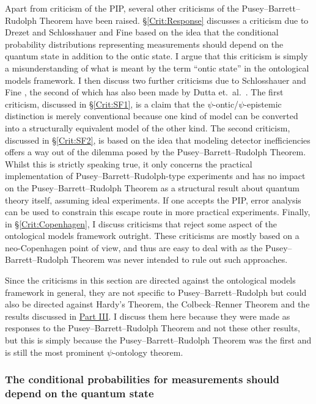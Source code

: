 \documentclass[DIV=calc,fontsize=12pt]{scrartcl} %
\theoremstyle{definition}
\theoremstyle{plain}
\begin{document}
Apart from criticism of the PIP, several other criticisms of the
Pusey--Barrett--Rudolph Theorem have been raised.
\S\ref{Crit:Response} discusses a criticism due to Drezet
\cite{Drezet2012, Drezet2012a} and Schlosshauer and Fine
\cite{Schlosshauer2012} based on the idea that the conditional
probability distributions representing measurements should depend on
the quantum state in addition to the ontic state.  I argue that this
criticism is simply a misunderstanding of what is meant by the term
``ontic state'' in the ontological models framework.  I then discuss
two further criticisms due to Schlosshauer and Fine
\cite{Schlosshauer2012}, the second of which has also been made by
Dutta et.\ al.\ \cite{Dutta2014}.  The first criticism, discussed in
\S\ref{Crit:SF1}, is a claim that the $\psi$-ontic/$\psi$-epistemic
distinction is merely conventional because one kind of model can be
converted into a structurally equivalent model of the other kind.  The
second criticism, discussed in \S\ref{Crit:SF2}, is based on the idea
that modeling detector inefficiencies offers a way out of the dilemma
posed by the Pusey--Barrett--Rudolph Theorem.  Whilst this is strictly
speaking true, it only concerns the practical implementation of
Pusey--Barrett--Rudolph-type experiments and has no impact on the
Pusey--Barrett--Rudolph Theorem as a structural result about quantum
theory itself, assuming ideal experiments.  If one accepts the PIP,
error analysis can be used to constrain this escape route in more
practical experiments.  Finally, in \S\ref{Crit:Copenhagen}, I discuss
criticisms that reject some aspect of the ontological models framework
outright.  These criticisms are mostly based on a neo-Copenhagen point
of view, and thus are easy to deal with as the Pusey--Barrett--Rudolph
Theorem was never intended to rule out such approaches.

Since the criticisms in this section are directed against the
ontological models framework in general, they are not specific to Pusey--Barrett--Rudolph
but could also be directed against Hardy's Theorem, the Colbeck--Renner
Theorem and the results discussed in \hyperref[Beyond]{Part III}.  I discuss
them here because they were made as responses to the Pusey--Barrett--Rudolph Theorem and
not these other results, but this is simply because the Pusey--Barrett--Rudolph Theorem
was the first and is still the most prominent $\psi$-ontology theorem.

\subsubsection{The conditional probabilities for measurements should
depend on the quantum state}
\end{document}
